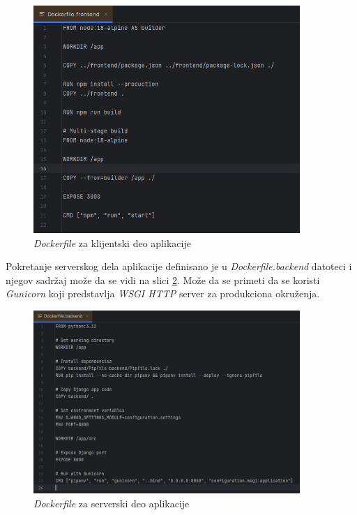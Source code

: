 \documentclass[12pt,oneside]{memoir}
\begin{document}
\begin{figure}[h]
\centering
\includegraphics[width=0.9\textwidth]{images/docker_frontend.png}
\caption{\emph{Dockerfile} za klijentski deo aplikacije}
\label{fig:docker_frontend}
\end{figure}

Pokretanje serverskog dela aplikacije definisano je u \emph{Dockerfile.backend} datoteci i njegov sadržaj može da se vidi na slici \ref{fig:docker_backend}. Može da se primeti da se koristi \emph{Gunicorn} koji predstavlja \emph{WSGI HTTP} server za produkciona okruženja.

\begin{figure}[H]
\centering
\includegraphics[width=0.9\textwidth]{images/docker_backend.png}
\caption{\emph{Dockerfile} za serverski deo aplikacije}
\label{fig:docker_backend}
\end{figure}
\end{document}
